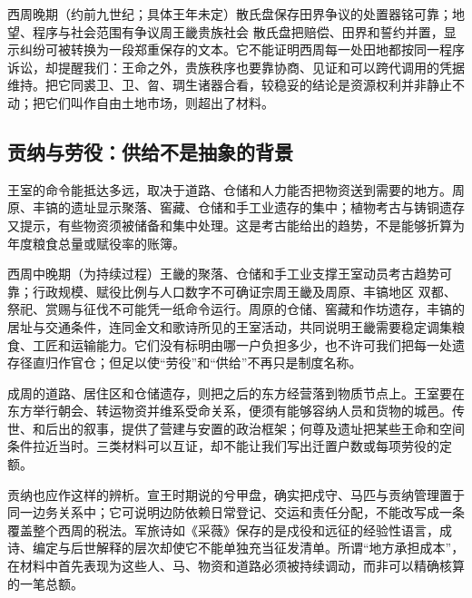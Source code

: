 \begin{event}{西周晚期（约前九世纪；具体王年未定）}{散氏盘保存田界争议的处置}{器铭可靠；地望、程序与社会范围有争议}{周王畿贵族社会}
散氏盘把赔偿、田界和誓约并置，显示纠纷可被转换为一段郑重保存的文本。它不能证明西周每一处田地都按同一程序诉讼，却提醒我们：王命之外，贵族秩序也要靠协商、见证和可以跨代调用的凭据维持。把它同裘卫、卫、曶、琱生诸器合看，较稳妥的结论是资源权利并非静止不动；把它们叫作自由土地市场，则超出了材料。
\end{event}

\subsection{贡纳与劳役：供给不是抽象的背景}

王室的命令能抵达多远，取决于道路、仓储和人力能否把物资送到需要的地方。周原、丰镐的遗址显示聚落、窖藏、仓储和手工业遗存的集中；植物考古与铸铜遗存又提示，有些物资须被储备和集中处理。这是考古能给出的趋势，不是能够折算为年度粮食总量或赋役率的账簿。

\begin{event}{西周中晚期（为持续过程）}{王畿的聚落、仓储和手工业支撑王室动员}{考古趋势可靠；行政规模、赋役比例与人口数字不可确证}{宗周王畿及周原、丰镐地区}
双都、祭祀、赏赐与征伐不可能凭一纸命令运行。周原的仓储、窖藏和作坊遗存，丰镐的居址与交通条件，连同金文和歌诗所见的王室活动，共同说明王畿需要稳定调集粮食、工匠和运输能力。它们没有标明由哪一户负担多少，也不许可我们把每一处遗存径直归作官仓；但足以使“劳役”和“供给”不再只是制度名称。

成周的道路、居住区和仓储遗存，则把之后的东方经营落到物质节点上。王室要在东方举行朝会、转运物资并维系受命关系，便须有能够容纳人员和货物的城邑。传世、和后出的叙事，提供了营建与安置的政治框架；何尊及遗址把某些王命和空间条件拉近当时。三类材料可以互证，却不能让我们写出迁置户数或每项劳役的定额。
\end{event}

贡纳也应作这样的辨析。宣王时期说的兮甲盘，确实把戍守、马匹与贡纳管理置于同一边务关系中；它可说明边防依赖日常登记、交运和责任分配，不能改写成一条覆盖整个西周的税法。军旅诗如《采薇》保存的是戍役和远征的经验性语言，成诗、编定与后世解释的层次却使它不能单独充当征发清单。所谓“地方承担成本”，在材料中首先表现为这些人、马、物资和道路必须被持续调动，而非可以精确核算的一笔总额。

